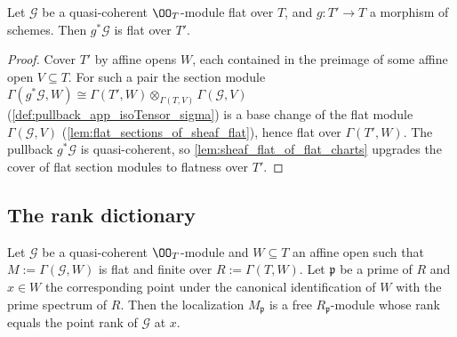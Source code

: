 \begin{lemma}
  \label{lem:sheaf_flat_pullback}
  \leanok
  Let \(\mathcal G\) be a quasi-coherent \(\OO_T\)-module flat over \(T\),
  and \(g : T' \to T\) a morphism of schemes.  Then \(g^*\mathcal G\) is
  flat over \(T'\).
\end{lemma}

\begin{proof}
  \leanok
  Cover \(T'\) by affine opens \(W\), each contained in the preimage of some
  affine open \(V \subseteq T\).  For such a pair the section module
  \(\Gamma(g^*\mathcal G, W) \cong
    \Gamma(T', W) \otimes_{\Gamma(T, V)} \Gamma(\mathcal G, V)\)
  (\cref{def:pullback_app_isoTensor_sigma}) is a base change of the flat
  module \(\Gamma(\mathcal G, V)\) (\cref{lem:flat_sections_of_sheaf_flat}),
  hence flat over \(\Gamma(T', W)\).  The pullback \(g^*\mathcal G\) is
  quasi-coherent, so \cref{lem:sheaf_flat_of_flat_charts} upgrades the cover
  of flat section modules to flatness over \(T'\).
\end{proof}

\subsection{The rank dictionary}

\begin{theorem}
  \label{thm:stalk_rank_eq_point_rank}
  \leanok
  Let \(\mathcal G\) be a quasi-coherent \(\OO_T\)-module and
  \(W \subseteq T\) an affine open such that \(M := \Gamma(\mathcal G, W)\)
  is flat and finite over \(R := \Gamma(T, W)\).  Let \(\mathfrak p\) be a
  prime of \(R\) and \(x \in W\) the corresponding point under the canonical
  identification of \(W\) with the prime spectrum of \(R\).  Then the
  localization \(M_{\mathfrak p}\) is a free \(R_{\mathfrak p}\)-module
  whose rank equals the point rank of \(\mathcal G\) at \(x\).
\end{theorem}

